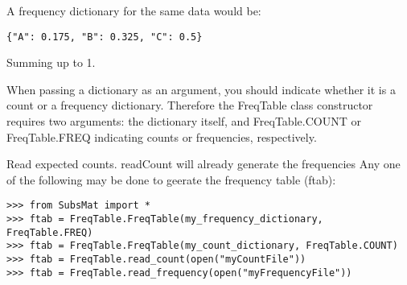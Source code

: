 \begin{enumerate}
 A frequency dictionary for the same data would be:

\begin{verbatim}
{"A": 0.175, "B": 0.325, "C": 0.5}
\end{verbatim}

Summing up to 1.

When passing a dictionary as an argument, you should indicate whether it is a count or a frequency dictionary. Therefore the FreqTable class constructor requires two arguments: the dictionary itself, and FreqTable.COUNT or FreqTable.FREQ indicating counts or frequencies, respectively.

Read expected counts. readCount will already generate the frequencies
Any one of the following may be done to geerate the frequency table (ftab):

\begin{verbatim}
>>> from SubsMat import *
>>> ftab = FreqTable.FreqTable(my_frequency_dictionary, FreqTable.FREQ)
>>> ftab = FreqTable.FreqTable(my_count_dictionary, FreqTable.COUNT)
>>> ftab = FreqTable.read_count(open("myCountFile"))
>>> ftab = FreqTable.read_frequency(open("myFrequencyFile"))
\end{verbatim}

\end{enumerate}
